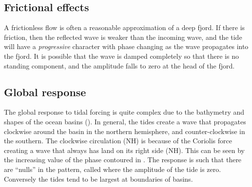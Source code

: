 \subsection{Frictional effects}
 
A frictionless flow is often a reasonable approximation of a deep fjord.  If there is friction, then the reflected wave is weaker than the incoming wave, and the tide will have a \emph{progressive} character with phase changing as the wave propagates into the fjord.  It is possible that the wave is damped completely so that there is no standing component, and the amplitude falls to zero at the head of the fjord.  

\subsection{Global response}

The global response to tidal forcing is quite complex due to the bathymetry and shapes of the ocean basins (). In general, the tides create a wave that propagates clockwise around the basin in the northern hemisphere, and counter-clockwise in the southern.  The clockwise circulation (NH) is because of the Coriolis force creating a wave that always has land on its right side (NH).  This can be seen by the increasing value of the phase contoured in . The response is such that there are ``nulls'' in the pattern, called  where the amplitude of the tide is zero.  Conversely the tides tend to be largest at boundaries of basins.  

